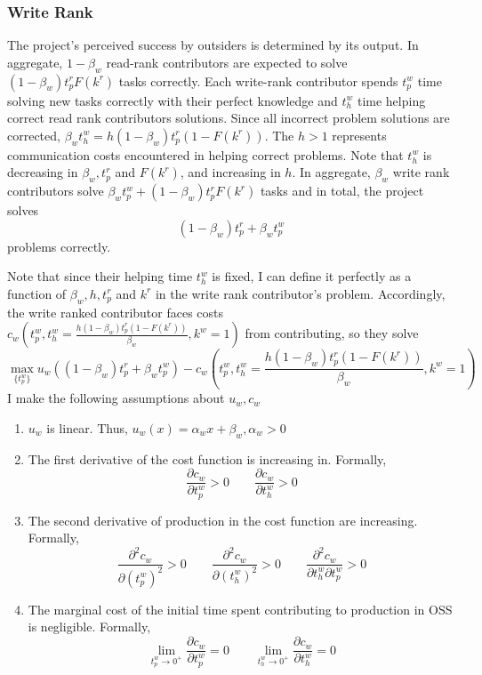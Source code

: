 \documentclass[source/paper/main.tex]{subfiles}
\begin{document}
\subsubsection{Write Rank}
The project's perceived success by outsiders is determined by its output. In aggregate, $1-\beta_w$ read-rank contributors are expected to solve $(1-\beta_w) t_p^rF(k^r)$ tasks correctly. Each write-rank contributor spends $t_p^w$ time solving new tasks correctly with their perfect knowledge and $t_h^w$ time helping correct read rank contributors solutions. Since all incorrect problem solutions are corrected, $\beta_w t_h^w = h (1-\beta_w) t_p^r(1-F(k^r))$. The $h>1$ represents communication costs encountered in helping correct problems. Note that $t_h^w$ is decreasing in $\beta_w, t_p^r$ and $F(k^r)$, and increasing in $h$. In aggregate, $\beta_w$ write rank contributors solve $\beta_w t_p^w + (1-\beta_w) t_p^rF(k^r)$ tasks and in total, the project solves
$$(1-\beta_w) t_p^r + \beta_w t_p^w $$
problems correctly.

\qquad Note that since their helping time $t_h^w$ is fixed, I can define it perfectly as a function of $\beta_w, h, t_p^r$ and $k^r$ in the write rank contributor's problem. Accordingly, the write ranked contributor faces costs $c_w\left(t_p^w, t_h^w = \frac{h (1-\beta_w) t_p^r(1-F(k^r))}{\beta_w}, k^w = 1\right)$ from contributing, so they solve
$$\max_{\{t_p^w\}} u_w\left((1-\beta_w) t_p^r + \beta_w t_p^w \right) - c_w\left(t_p^w, t_h^w = \frac{ h (1-\beta_w) t_p^r(1-F(k^r))}{\beta_w}, k^w = 1\right)$$
I make the following assumptions about $u_w, c_w$
\begin{enumerate}
    \item $u_w$ is linear. Thus, $u_w(x) = \alpha_wx + \beta_w, \alpha_w > 0$
    \item The first derivative of the cost function is increasing in. Formally, 
    $$\frac{\partial c_w}{\partial t_p^w}>0 \qquad \frac{\partial c_w}{\partial t_h^w}>0 $$   
    \item  The second derivative of production in the cost function are increasing. Formally, $$ \frac{\partial^2 c_w}{\partial (t_p^w)^2}>0 \qquad  \frac{\partial^2 c_w}{\partial (t_h^w)^2}>0 \qquad  \frac{\partial^2 c_w}{\partial t_h^w \partial t_p^w}>0$$
    \item The marginal cost of the initial time spent contributing to production in OSS is negligible. Formally,
    $$\lim_{t_p^w \to 0^+} \frac{\partial c_w}{\partial t_p^w} = 0 \qquad \lim_{t_h^w \to 0^+} \frac{\partial c_w}{\partial t_h^w} = 0$$
\end{enumerate}
\end{document}
